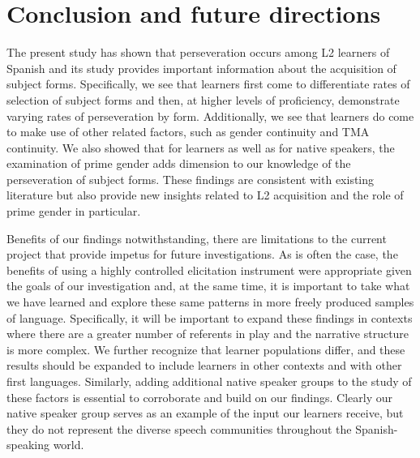 \documentclass[output=paper]{langscibook}
\begin{document}
\section{Conclusion and future directions}

The present study has shown that perseveration occurs among L2 learners of Spanish and its study provides important information about the acquisition of subject forms. Specifically, we see that learners first come to differentiate rates of selection of subject forms and then, at higher levels of proficiency, demonstrate varying rates of perseveration by form. Additionally, we see that learners do come to make use of other related factors, such as gender continuity and TMA continuity. We also showed that for learners as well as for native speakers, the examination of prime gender adds dimension to our knowledge of the perseveration of subject forms. These findings are consistent with existing literature but also provide new insights related to L2 acquisition and the role of prime gender in particular.


Benefits of our findings notwithstanding, there are limitations to the current project that provide impetus for future investigations. As is often the case, the benefits of using a highly controlled elicitation instrument were appropriate given the goals of our investigation and, at the same time, it is important to take what we have learned and explore these same patterns in more freely produced samples of language. Specifically, it will be important to expand these findings in contexts where there are a greater number of referents in play and the narrative structure is more complex. We further recognize that learner populations differ, and these results should be expanded to include learners in other contexts and with other first languages. Similarly, adding additional native speaker groups to the study of these factors is essential to corroborate and build on our findings. Clearly our native speaker group serves as an example of the input our learners receive, but they do not represent the diverse speech communities throughout the Spanish-speaking world. 

\printbibliography[heading=subbibliography]
\end{document}

